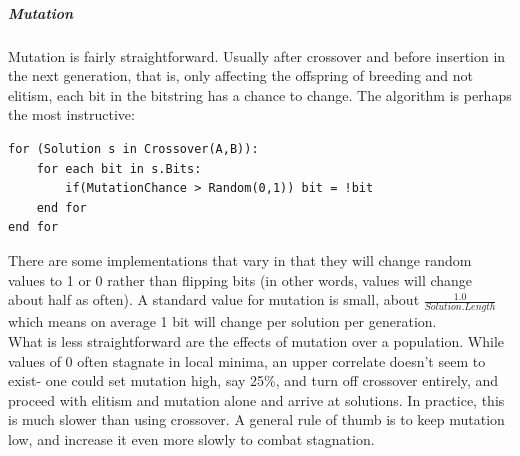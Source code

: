 \subparagraph{Mutation}
Mutation is fairly straightforward.  Usually after crossover and before insertion in the next generation, that is, only affecting the offspring of breeding and not elitism, each bit in the bitstring has a chance to change.  The algorithm is perhaps the most instructive: \begin{lstlisting}[language=algorithm, caption={Mutation}, label={fig:mutation}]
for (Solution s in Crossover(A,B)):
	for each bit in s.Bits:
		if(MutationChance > Random(0,1)) bit = !bit
	end for
end for
\end{lstlisting}
There are some implementations that vary in that they will change random values to 1 or 0 rather than flipping bits (in other words, values will change about half as often).  A standard value for mutation is small, about 
${\frac{1.0}{Solution.Length}}$ which means on average 1 bit will change per solution per generation.\\
What is less straightforward are the effects of mutation over a population.  While values of 0 often stagnate in local minima, an upper correlate doesn't seem to exist- one could set mutation high, say 25\%, and turn off crossover entirely, and proceed with elitism and mutation alone and arrive at solutions.  In practice, this is much slower than using crossover. A general rule of thumb is to keep mutation low, and increase it even more slowly to combat stagnation.\\
